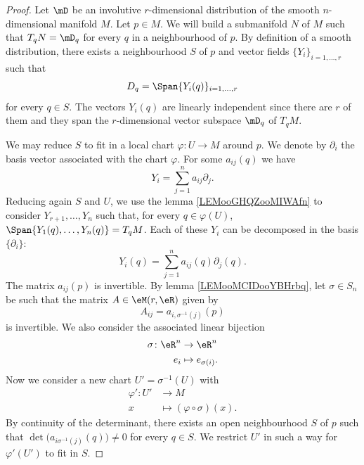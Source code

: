 \begin{proof}
	Let \( \mD\) be an involutive \( r\)-dimensional distribution of the smooth \( n\)-dimensional manifold \( M\). Let \( p\in M\). We will build a submanifold \( N\) of \( M\) such that \( T_qN=\mD_q\) for every \( q\) in a neighbourhood of \( p\). By definition of a smooth distribution, there exists a neighbourhood \( S\) of \( p\) and vector fields \( \{ Y_i \}_{i=1,\ldots, r}\) such that
	\begin{equation}
		D_q=\Span\{ Y_i(q) \}_{i=1,\ldots, r}
	\end{equation}
	for every \( q\in S\). The vectors \( Y_i(q)\) are linearly independent since there are \( r\) of them and they span the \( r\)-dimensional vector subspace \( \mD_q\) of \( T_qM\).

	We may reduce \( S\) to fit in a local chart \( \varphi\colon U\to M\) around \( p\). We denote by \( \partial_i\) the basis vector associated with the chart \( \varphi\). For some \( a_{ij}(q)\) we have
	\begin{equation}
		Y_i=\sum_{j=1}^na_{ij}\partial_j.
	\end{equation}
	Reducing again \( S\) and \( U\), we use the lemma \ref{LEMooGHQZooMIWAfn} to consider \( Y_{r+1},\ldots,  Y_n\) such that, for every \( q\in \varphi(U)\), \( \Span\{ Y_1(q),\ldots, Y_n(q) \}=T_qM\). Each of these \( Y_i\) can be decomposed in the basis \( \{ \partial_i \}\):
	\begin{equation}
		Y_i(q)=\sum_{j=1}^na_{ij}(q)\partial_j(q).
	\end{equation}
	The matrix \( a_{ij}(p)\) is invertible. By lemma \ref{LEMooMCIDooYBHrbq}, let \( \sigma\in S_n\) be such that the matrix \( A\in \eM(r,\eR)\) given by
	\begin{equation}
		A_{ij}=a_{i,\sigma^{-1}(j)}(p)
	\end{equation}
	is invertible. We also consider the associated linear bijection
	\begin{equation}
		\begin{aligned}
			\sigma\colon \eR^n & \to \eR^n              \\
			e_i                & \mapsto e_{\sigma(i)}.
		\end{aligned}
	\end{equation}
	Now we consider a new chart \( U'=\sigma^{-1}(U)\) with
	\begin{equation}
		\begin{aligned}
			\varphi'\colon U' & \to M                             \\
			x                 & \mapsto (\varphi\circ \sigma)(x).
		\end{aligned}
	\end{equation}
	By continuity of the determinant, there exists an open neighbourhood \( S\) of \( p\) such that \( \det\big( a_{i\sigma^{-1}(j)}(q) \big)\neq 0\) for every \( q\in S\). We restrict \( U'\) in such a way for \( \varphi'(U')\) to fit in \( S\).


\end{proof}
